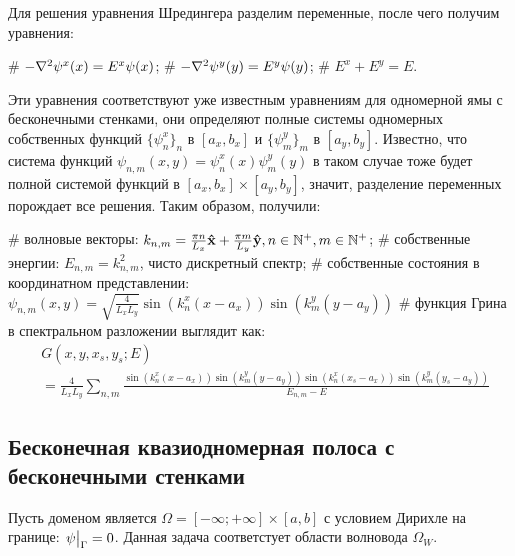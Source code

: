 Для решения уравнения Шредингера разделим переменные, после чего получим уравнения:
\begin{ilist}
# $-\laplacian \psi^x(x) = E^x \psi(x)$;
# $-\laplacian \psi^y(y) = E^y \psi(y)$;
# $E^x + E^y = E$.
\end{ilist}
Эти уравнения соответствуют уже известным уравнениям для одномерной ямы с бесконечными стенками, они определяют полные системы одномерных собственных функций $\{\psi^x_n\}_n$ в $[a_x, b_x]$ и $\{\psi^y_m\}_m$ в $[a_y, b_y]$. Известно, что система функций $\psi_{n, m}(x, y) = \psi_n^x(x) \psi_m^y(y)$ в таком случае тоже будет полной системой функций в $[a_x, b_x] \times [a_y, b_y]$, значит, разделение переменных порождает все решения. Таким образом, получили:

\begin{ilist}
# волновые векторы: $k_{n, m} = \frac{\pi n}{L_x} \vb{\hat{x}} + \frac{\pi m}{L_y} \vb{\hat{y}}, n \in \mathbb{N}^+, m \in \mathbb{N}^+$;
# собственные энергии: $E_{n, m} = k_{n, m}^2$, чисто дискретный спектр;
# собственные состояния в координатном представлении: $\psi_{n, m}(x, y) = \sqrt{\frac{4}{L_x L_y}} \sin(k^x_n (x - a_x)) \sin(k^y_m (y - a_y))$
# функция Грина в спектральном разложении выглядит как:
\begin{align*}
& G(x, y, x_s, y_s; E) \\
& = \frac{4}{L_x L_y} \sum\limits_{n, m} \frac{\sin(k^x_n (x - a_x)) \sin(k^y_m (y - a_y)) \sin(k^x_n (x_s - a_x)) \sin(k^y_m (y_s - a_y))}{E_{n, m} - E}
\end{align*}
\end{ilist}

\subsection{Бесконечная квазиодномерная полоса с бесконечными стенками}
Пусть доменом является $\Omega = [-\infty; +\infty] \times [a, b]$ с условием Дирихле на границе: $\eval{\psi}_{\Gamma} = 0$. Данная задача соответстует области волновода $\Omega_W$.

